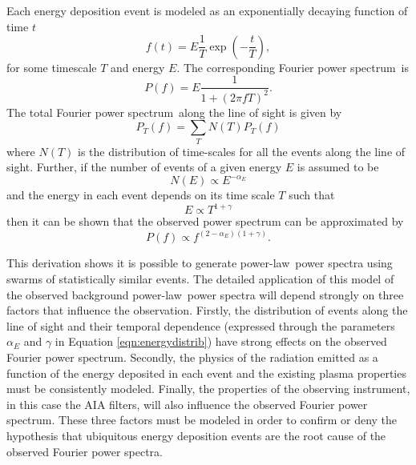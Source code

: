 \documentclass[preprint]{../aastex52/aastex}
\newcommand{\PS}{power spectrum}
\newcommand{\PL}{power-law}
\newcommand{\Fps}{Fourier \PS}
\begin{document}
Each energy deposition event is modeled as an exponentially decaying
function of time $t$
\begin{equation}
\label{eqn:expdecay}
f(t) = E \frac{1}{T}\exp\left(-\frac{t}{T}\right),
\end{equation}
for some timescale $T$ and energy $E$.  The corresponding \Fps\ is
\begin{equation}
\label{eqn:ftexpdecay}
P(f) = E\frac{1}{1 + (2\pi f T)^{2}}.
\end{equation}
The total \Fps\ along the line of sight is given by
\begin{equation}
\label{eqn:ftexpdecay}
P_{T}(f) = \sum_{T}N(T)P_{T}(f)
\end{equation}
where $N(T)$ is the distribution of time-scales for all the events
along the line of sight.  Further, if the number of events of a given
energy $E$ is assumed to be
\begin{equation}
\label{eqn:energydistrib}
N(E) \propto E^{-\alpha_{E}}
\end{equation}
and the energy in each event depends on its time scale $T$ such that
\begin{equation}
\label{eqn:energydistrib}
E \propto T^{1+\gamma}
\end{equation}
then it can be shown \cite{} that the observed power spectrum can be
approximated by
\begin{equation}
\label{eqn:energydistrib}
P(f) \propto f^{(2-\alpha_{E})(1+\gamma)}.
\end{equation}

This derivation shows it is possible to generate \PL\ power spectra
using swarms of statistically similar events.  The detailed
application of this model of the observed background \PL\ power
spectra will depend strongly on three factors that influence the
observation.  Firstly, the distribution of events along the line of
sight and their temporal dependence (expressed through the parameters
$\alpha_{E}$ and $\gamma$ in Equation \ref{eqn:energydistrib}) have
strong effects on the observed \Fps.  Secondly, the physics of the
radiation emitted as a function of the energy deposited in each event
and the existing plasma properties must be consistently modeled.
Finally, the properties of the observing instrument, in this case the
AIA filters, will also influence the observed \Fps.  These three
factors must be modeled in order to confirm or deny the hypothesis
that ubiquitous energy deposition events are the root cause of the
observed Fourier power spectra.
\end{document}
